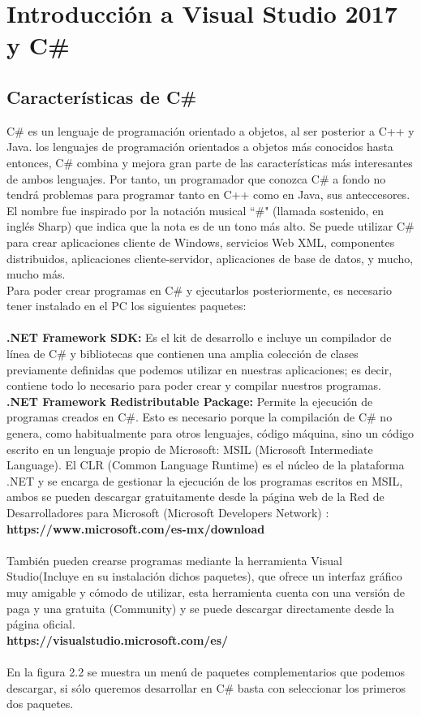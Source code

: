 \documentclass[12pt,a4paper]{report}
\begin{document}
\chapter{Introducción a Visual Studio 2017 y C\# }
\section{Características de C\#}
C\# es un lenguaje de programación orientado a objetos, al ser posterior a C++ y Java. los lenguajes de programación orientados a objetos más conocidos hasta entonces, C\# combina y mejora gran parte de las características más interesantes de ambos lenguajes. Por tanto, un programador que conozca C\# a fondo no tendrá problemas para programar tanto en C++ como en Java, sus anteccesores.\\El nombre fue inspirado por la notación musical ``\#" (llamada sostenido, en inglés Sharp) que indica que la nota es de un tono más alto. Se puede utilizar C\# para crear aplicaciones cliente de Windows, servicios Web XML, componentes distribuidos, aplicaciones cliente-servidor, aplicaciones de base de datos, y mucho, mucho más.\\Para poder crear programas en C\# y ejecutarlos posteriormente, es necesario tener instalado en el PC los siguientes paquetes:\\\\\textbf{.NET Framework SDK:} Es el kit de desarrollo e incluye un compilador de línea de C\# y bibliotecas que contienen una amplia colección de clases previamente definidas que podemos utilizar en nuestras aplicaciones; es decir, contiene todo lo necesario para poder crear y compilar nuestros programas.\\\textbf{.NET Framework Redistributable Package: } Permite la ejecución de programas creados en C\#. Esto es necesario porque la compilación de C\# no genera, como habitualmente para otros lenguajes, código máquina, sino un código escrito en un lenguaje propio de Microsoft: MSIL (Microsoft Intermediate Language). El CLR (Common Language Runtime) es el núcleo de la plataforma .NET y se encarga de gestionar la ejecución de los programas escritos en MSIL, ambos se pueden descargar gratuitamente desde la página web de la Red de Desarrolladores para Microsoft (Microsoft Developers Network) :\\ \textbf{https://www.microsoft.com/es-mx/download}\\\\También pueden crearse programas mediante la herramienta Visual Studio(Incluye en su instalación dichos paquetes), que ofrece un interfaz gráfico muy amigable y cómodo de utilizar, esta herramienta cuenta con una versión de paga y una gratuita (Community) y se puede descargar directamente desde la página oficial.\\\textbf{https://visualstudio.microsoft.com/es/}\\\\En la figura 2.2 se muestra un menú de paquetes complementarios que podemos descargar, si sólo queremos desarrollar en C\# basta con seleccionar los primeros dos paquetes.
\end{document}
